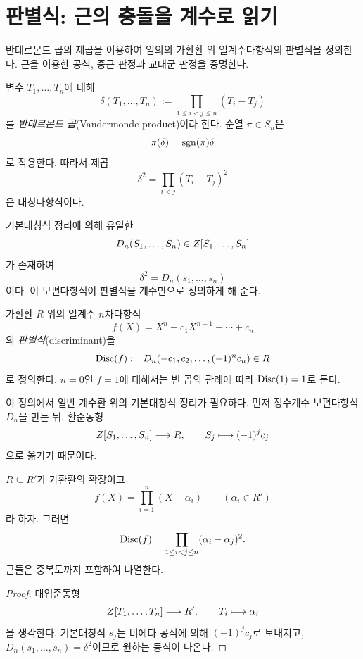 \clearpage
\section{판별식: 근의 충돌을 계수로 읽기}
\label{sec:polynomial-discriminant}

\begin{learninggoal}
반데르몬드 곱의 제곱을 이용하여 임의의 가환환 위 일계수다항식의 판별식을 정의한다. 근을 이용한 공식, 중근 판정과 교대군 판정을 증명한다.
\end{learninggoal}

변수 $T_1,\dots,T_n$에 대해
\[
  \delta(T_1,\dots,T_n)
  :=\prod_{1\le i<j\le n}(T_i-T_j)
\]
를 \emph{반데르몬드 곱}(Vandermonde product)이라 한다. 순열 $\pi\in S_n$은
\[
  \pi(\delta)=\operatorname{sgn}(\pi)\delta
\]
로 작용한다. 따라서 제곱
\[
  \delta^2=\prod_{i<j}(T_i-T_j)^2
\]
은 대칭다항식이다.

기본대칭식 정리에 의해 유일한
\[
  D_n(S_1,\dots,S_n)\in Z[S_1,\dots,S_n]
\]
가 존재하여
\[
  \delta^2=D_n(s_1,\dots,s_n)
\]
이다. 이 보편다항식이 판별식을 계수만으로 정의하게 해 준다.

\begin{definition}
가환환 $R$ 위의 일계수 $n$차다항식
\[
  f(X)=X^n+c_1X^{n-1}+\cdots+c_n
\]
의 \emph{판별식}(discriminant)을
\[
  \operatorname{Disc}(f)
  :=D_n(-c_1,c_2,\dots,(-1)^nc_n)
  \in R
\]
로 정의한다. $n=0$인 $f=1$에 대해서는 빈 곱의 관례에 따라 $\operatorname{Disc}(1)=1$로 둔다.
\end{definition}

이 정의에서 일반 계수환 위의 기본대칭식 정리가 필요하다. 먼저 정수계수 보편다항식 $D_n$을 만든 뒤, 환준동형
\[
  Z[S_1,\dots,S_n]\longrightarrow R,
  \qquad
  S_j\longmapsto(-1)^jc_j
\]
으로 옮기기 때문이다.

\begin{theorem}
\label{thm:discriminant-root-formula}
$R\subseteq R'$가 가환환의 확장이고
\[
  f(X)=\prod_{i=1}^n(X-\alpha_i)
  \qquad(\alpha_i\in R')
\]
라 하자. 그러면
\[
  \operatorname{Disc}(f)
  =\prod_{1\le i<j\le n}(\alpha_i-\alpha_j)^2.
\]
근들은 중복도까지 포함하여 나열한다.
\end{theorem}

\begin{proof}
대입준동형
\[
  Z[T_1,\dots,T_n]\longrightarrow R',
  \qquad
  T_i\longmapsto\alpha_i
\]
을 생각한다. 기본대칭식 $s_j$는 비에타 공식에 의해 $(-1)^jc_j$로 보내지고, $D_n(s_1,\dots,s_n)=\delta^2$이므로 원하는 등식이 나온다.
\end{proof}

